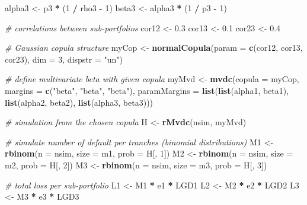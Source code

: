 \documentclass[]{article}
\newenvironment{Shaded}{\begin{snugshade}}{\end{snugshade}}
\newcommand{\CommentTok}[1]{\textcolor[rgb]{0.56,0.35,0.01}{\textit{#1}}}
\newcommand{\DataTypeTok}[1]{\textcolor[rgb]{0.13,0.29,0.53}{#1}}
\newcommand{\DecValTok}[1]{\textcolor[rgb]{0.00,0.00,0.81}{#1}}
\newcommand{\FloatTok}[1]{\textcolor[rgb]{0.00,0.00,0.81}{#1}}
\newcommand{\KeywordTok}[1]{\textcolor[rgb]{0.13,0.29,0.53}{\textbf{#1}}}
\newcommand{\NormalTok}[1]{#1}
\newcommand{\OperatorTok}[1]{\textcolor[rgb]{0.81,0.36,0.00}{\textbf{#1}}}
\newcommand{\StringTok}[1]{\textcolor[rgb]{0.31,0.60,0.02}{#1}}
\begin{document}
\begin{Shaded}
\begin{Highlighting}[]
\NormalTok{  alpha3 <-}\StringTok{ }\NormalTok{p3 }\OperatorTok{*}\StringTok{ }\NormalTok{(}\DecValTok{1} \OperatorTok{/}\StringTok{ }\NormalTok{rho3 }\OperatorTok{-}\StringTok{ }\DecValTok{1}\NormalTok{)}
\NormalTok{  beta3 <-}\StringTok{ }\NormalTok{alpha3 }\OperatorTok{*}\StringTok{ }\NormalTok{(}\DecValTok{1} \OperatorTok{/}\StringTok{ }\NormalTok{p3 }\OperatorTok{-}\StringTok{ }\DecValTok{1}\NormalTok{)}
  
\CommentTok{# correlations between sub-portfolios}
\NormalTok{  cor12 <-}\StringTok{ }\FloatTok{0.3}
\NormalTok{  cor13 <-}\StringTok{ }\FloatTok{0.1}
\NormalTok{  cor23 <-}\StringTok{ }\FloatTok{0.4}
  
\CommentTok{# Gaussian copula structure}
\NormalTok{  myCop <-}\StringTok{ }\KeywordTok{normalCopula}\NormalTok{(}\DataTypeTok{param =} \KeywordTok{c}\NormalTok{(cor12, cor13, cor23), }\DataTypeTok{dim =} \DecValTok{3}\NormalTok{, }\DataTypeTok{dispstr =} \StringTok{"un"}\NormalTok{)}
  
\CommentTok{# define multivariate beta with given copula}
\NormalTok{  myMvd <-}\StringTok{ }\KeywordTok{mvdc}\NormalTok{(}\DataTypeTok{copula =}\NormalTok{ myCop,}
                \DataTypeTok{margins =} \KeywordTok{c}\NormalTok{(}\StringTok{"beta"}\NormalTok{, }\StringTok{"beta"}\NormalTok{, }\StringTok{"beta"}\NormalTok{),}
                \DataTypeTok{paramMargins =} \KeywordTok{list}\NormalTok{(}\KeywordTok{list}\NormalTok{(alpha1, beta1),}
                                    \KeywordTok{list}\NormalTok{(alpha2, beta2),}
                                    \KeywordTok{list}\NormalTok{(alpha3, beta3)))}

\CommentTok{# simulation from the chosen copula}
\NormalTok{  H <-}\StringTok{ }\KeywordTok{rMvdc}\NormalTok{(nsim, myMvd)}
  
\CommentTok{# simulate number of default per tranches (binomial distributions)}
\NormalTok{  M1 <-}\StringTok{ }\KeywordTok{rbinom}\NormalTok{(}\DataTypeTok{n =}\NormalTok{ nsim, }\DataTypeTok{size =}\NormalTok{ m1, }\DataTypeTok{prob =}\NormalTok{ H[, }\DecValTok{1}\NormalTok{])}
\NormalTok{  M2 <-}\StringTok{ }\KeywordTok{rbinom}\NormalTok{(}\DataTypeTok{n =}\NormalTok{ nsim, }\DataTypeTok{size =}\NormalTok{ m2, }\DataTypeTok{prob =}\NormalTok{ H[, }\DecValTok{2}\NormalTok{])}
\NormalTok{  M3 <-}\StringTok{ }\KeywordTok{rbinom}\NormalTok{(}\DataTypeTok{n =}\NormalTok{ nsim, }\DataTypeTok{size =}\NormalTok{ m3, }\DataTypeTok{prob =}\NormalTok{ H[, }\DecValTok{3}\NormalTok{])}
  
\CommentTok{# total loss per sub-portfolio}
\NormalTok{  L1 <-}\StringTok{ }\NormalTok{M1 }\OperatorTok{*}\StringTok{ }\NormalTok{e1 }\OperatorTok{*}\StringTok{ }\NormalTok{LGD1}
\NormalTok{  L2 <-}\StringTok{ }\NormalTok{M2 }\OperatorTok{*}\StringTok{ }\NormalTok{e2 }\OperatorTok{*}\StringTok{ }\NormalTok{LGD2}
\NormalTok{  L3 <-}\StringTok{ }\NormalTok{M3 }\OperatorTok{*}\StringTok{ }\NormalTok{e3 }\OperatorTok{*}\StringTok{ }\NormalTok{LGD3}
  

\end{Highlighting}
\end{Shaded}
\end{document}
